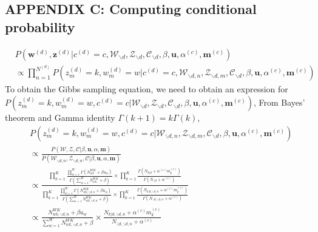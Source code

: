 \documentclass[a4paper]{article}
\begin{document}
  \subsection*{APPENDIX C: Computing conditional probability}
  \begin{equation}
  \begin{aligned}
  & P(\boldsymbol{w}^{(d)}, \boldsymbol{z}^{(d)}|c^{(d)}=c, \mathcal{W}_{\backslash d}, \mathcal{Z}_{\backslash d}, \mathcal{C}_{\backslash d}, \beta, \boldsymbol{u}, \alpha^{(c)}, \boldsymbol{m}^{(c)}) \\& \propto \prod_{n=1}^{N^{(d)}}P(z^{(d)}_m=k, w^{(d)}_m=w| c^{(d)}=c, \mathcal{W}_{\backslash d, n}, \mathcal{Z}_{\backslash d,m}, \mathcal{C}_{\backslash d}, \beta, \boldsymbol{u}, \alpha^{(c)}, \boldsymbol{m}^{(c)})
  \end{aligned}
  \end{equation} 
  To obtain the Gibbs sampling equation, we need to obtain an expression for $P(z^{(d)}_m=k,  w^{(d)}_m=w, c^{(d)}=c|\mathcal{W}_{\backslash d}, \mathcal{Z}_{\backslash d}, \mathcal{C}_{\backslash d}, \beta, \boldsymbol{u}, \alpha^{(c)}, \boldsymbol{m}^{(c)})$,
  From Bayes' theorem and Gamma identity $\Gamma(k+1)=k\Gamma(k)$,
  \begin{equation}
  \begin{aligned}
  & P(z^{(d)}_m=k, w^{(d)}_m=w, c^{(d)}=c|\mathcal{W}_{\backslash d, n}, \mathcal{Z}_{\backslash d,m}, \mathcal{C}_{\backslash d}, \beta, \boldsymbol{u}, \alpha^{(c)}, \boldsymbol{m}^{(c)}) \\& \propto 
  \frac{P(\mathcal{W}, \mathcal{Z}, \mathcal{C}|\beta, \boldsymbol{u}, \alpha, \boldsymbol{m})}{P(\mathcal{W}_{\backslash d, n}, \mathcal{Z}_{\backslash d, n}, \mathcal{C}|\beta, \boldsymbol{u}, \alpha, \boldsymbol{m})}\\& \propto \frac{\prod_{k=1}^{K}\frac{\prod_{w=1}^W\Gamma(N_{wk}^{WK}+\beta u_w)}{\Gamma(\sum_{w=1}^WN_{wk}^{WK}+\beta )}\times\prod_{k=1}^K\frac{\Gamma(N_{k|d}+\alpha^{(c)} m^{(c)}_k)}{\Gamma(N_{\cdot|d}+\alpha^{(c)})}}{\prod_{k=1}^{K}\frac{\prod_{w=1}^W\Gamma(N_{wk, \backslash d, n}^{WK}+\beta u_w)}{\Gamma(\sum_{w=1}^WN_{wk, \backslash d, n}^{WK}+\beta )}\times\prod_{k=1}^K\frac{\Gamma(N_{k|d, \backslash d, n}+\alpha^{(c)} m^{(c)}_k)}{\Gamma(N_{\cdot|d, \backslash d, n}+\alpha^{(c)})}}\\ & \propto 
  \frac{N_{wk, \backslash d, n}^{WK}+\beta u_w}{\sum_{w=1}^WN_{wk,  \backslash d, n}^{WK}+\beta}\times\frac{N_{k|d, \backslash d, n}+\alpha^{(c)} m^{(c)}_k}{N_{\cdot|d, \backslash d, n}+\alpha^{(c)}}
  \end{aligned}
  \end{equation}
\end{document}

